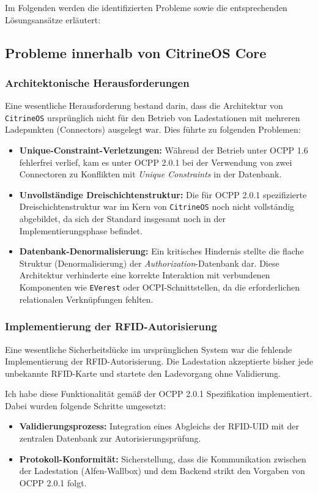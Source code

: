 \documentclass[12pt,a4paper]{report}
\begin{document}
Im Folgenden werden die identifizierten Probleme sowie die entsprechenden Lösungsansätze erläutert:

    \subsection{Probleme innerhalb von CitrineOS Core} 
    \subsubsection{Architektonische Herausforderungen} 
    Eine wesentliche Herausforderung bestand darin,
     dass die Architektur von \texttt{CitrineOS} ursprünglich nicht für den Betrieb von Ladestationen mit mehreren Ladepunkten (Connectors) ausgelegt war.
    Dies führte zu folgenden Problemen: \begin{itemize} 
        \item \textbf{Unique-Constraint-Verletzungen:} Während der Betrieb unter \gls{OCPP} 1.6 fehlerfrei verlief, kam es unter \gls{OCPP} 2.0.1 bei der Verwendung von zwei Connectoren zu Konflikten mit \textit{Unique Constraints} in der Datenbank. 
        \item \textbf{Unvollständige Dreischichtenstruktur:} Die für \gls{OCPP} 2.0.1 spezifizierte Dreischichtenstruktur war im Kern von \texttt{CitrineOS} noch nicht vollständig abgebildet, da sich der Standard insgesamt noch in der Implementierungsphase befindet. 
        \item \textbf{Datenbank-Denormalisierung:} Ein kritisches Hindernis stellte die flache Struktur (Denormalisierung) der \textit{Authorization}-Datenbank dar. Diese Architektur verhinderte eine korrekte Interaktion mit verbundenen Komponenten wie \texttt{EVerest} oder \gls{OCPI}-Schnittstellen, da die erforderlichen relationalen Verknüpfungen fehlten. 
    \end{itemize}

\subsubsection{Implementierung der RFID-Autorisierung}

Eine wesentliche Sicherheitslücke im ursprünglichen System war die fehlende Implementierung der RFID-Autorisierung. Die Ladestation akzeptierte bisher jede unbekannte RFID-Karte und startete den Ladevorgang ohne Validierung. 

Ich habe diese Funktionalität gemäß der \gls{OCPP} 2.0.1 Spezifikation implementiert. Dabei wurden folgende Schritte umgesetzt:
\begin{itemize}
    \item \textbf{Validierungsprozess:} Integration eines Abgleichs der RFID-UID mit der zentralen Datenbank zur Autorisierungsprüfung.
    \item \textbf{Protokoll-Konformität:} Sicherstellung, dass die Kommunikation zwischen der Ladestation (Alfen-Wallbox) und dem Backend strikt den Vorgaben von OCPP 2.0.1 folgt.
\end{itemize}
\end{document}

